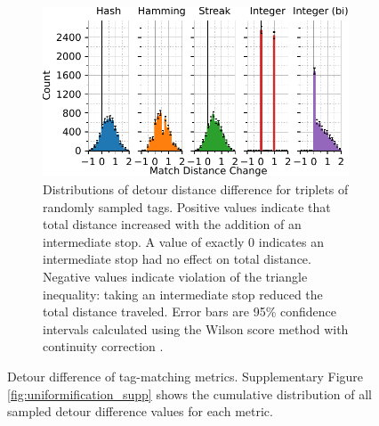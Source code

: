 \begin{figure}[!htbp]
\begin{center}
\begin{minipage}{\linewidth}
\begin{subfigure}[b]{\linewidth}
\includegraphics[width=\linewidth]{img/detour_difference/bitweight=0dot5+seed=1+title=low-triplet-analysis+viz=hist+_data_hathash_hash=6b0749ef97a58721+_script_fullcat_hash=ab23ac25d229f726+ext=}
\caption{
Distributions of detour distance difference for triplets of randomly sampled tags.
Positive values indicate that total distance increased with the addition of an intermediate stop.
A value of exactly 0 indicates an intermediate stop had no effect on total distance.
Negative values indicate violation of the triangle inequality: taking an intermediate stop reduced the total distance traveled.
Error bars are 95\% confidence intervals calculated using the Wilson score method with continuity correction \citep{newcombe1998two}.
} \label{fig:detour_difference_distribution}

\end{subfigure}
\end{minipage}

\caption{
Detour difference of tag-matching metrics.
Supplementary Figure \ref{fig:uniformification_supp} shows the cumulative distribution of all sampled detour difference values for each metric.
}
\label{fig:detour_difference}

\end{center}
\end{figure}
